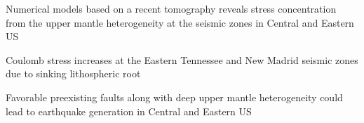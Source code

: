 \documentclass[draft,linenumbers]{agujournal2018}
\begin{document}



\begin{keypoints}
\item Numerical models based on a recent tomography reveals stress concentration from the upper mantle heterogeneity at the seismic zones in Central and Eastern US
\item Coulomb stress increases at the Eastern Tennessee and New Madrid seismic zones due to sinking lithospheric root
\item Favorable preexisting faults along with deep upper mantle  heterogeneity could lead to earthquake generation in Central and Eastern US
\end{keypoints}

%
%

\end{document}
